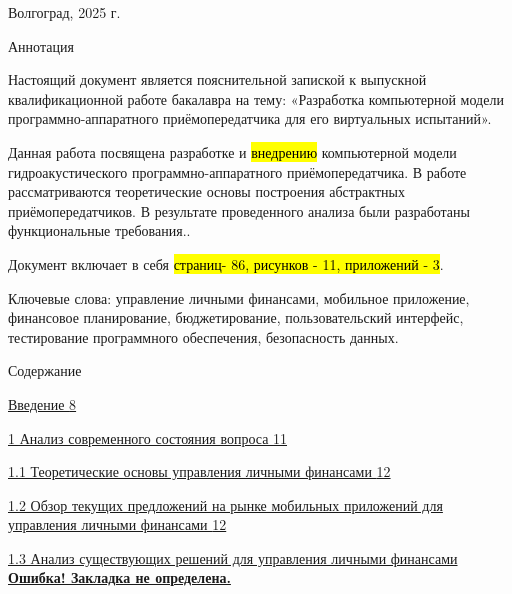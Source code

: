Волгоград, 2025 г.

Аннотация

Настоящий документ является пояснительной запиской к выпускной
квалификационной работе бакалавра на тему: «Разработка компьютерной
модели программно-аппаратного приёмопередатчика для его виртуальных
испытаний».

Данная работа посвящена разработке и \hl{внедрению} компьютерной модели
гидроакустического программно-аппаратного приёмопередатчика. В работе
рассматриваются теоретические основы построения абстрактных
приёмопередатчиков. В результате проведенного анализа были разработаны
функциональные требования..

Документ включает в себя \hl{страниц- 86, рисунков - 11, приложений -
3}.

Ключевые слова: управление личными финансами, мобильное приложение,
финансовое планирование, бюджетирование, пользовательский интерфейс,
тестирование программного обеспечения, безопасность данных.

Содержание

\hyperref[ux432ux432ux435ux434ux435ux43dux438ux435]{Введение
\hyperref[ux432ux432ux435ux434ux435ux43dux438ux435]{8}}

\hyperref[ux430ux43dux430ux43bux438ux437-ux441ux43eux432ux440ux435ux43cux435ux43dux43dux43eux433ux43e-ux441ux43eux441ux442ux43eux44fux43dux438ux44f-ux432ux43eux43fux440ux43eux441ux430]{1
Анализ современного состояния вопроса
\hyperref[ux430ux43dux430ux43bux438ux437-ux441ux43eux432ux440ux435ux43cux435ux43dux43dux43eux433ux43e-ux441ux43eux441ux442ux43eux44fux43dux438ux44f-ux432ux43eux43fux440ux43eux441ux430]{11}}

\hyperref[ux442ux435ux43eux440ux435ux442ux438ux447ux435ux441ux43aux438ux435-ux43eux441ux43dux43eux432ux44b-ux433ux438ux434ux440ux43eux430ux43aux443ux441ux442ux438ux447ux435ux441ux43aux438ux445-ux43fux440ux438ux451ux43cux43eux43fux435ux440ux435ux434ux430ux442ux447ux438ux43aux43eux432]{1.1
Теоретические основы управления личными финансами
\hyperref[ux442ux435ux43eux440ux435ux442ux438ux447ux435ux441ux43aux438ux435-ux43eux441ux43dux43eux432ux44b-ux433ux438ux434ux440ux43eux430ux43aux443ux441ux442ux438ux447ux435ux441ux43aux438ux445-ux43fux440ux438ux451ux43cux43eux43fux435ux440ux435ux434ux430ux442ux447ux438ux43aux43eux432]{12}}

\hyperref[_Toc167813676]{1.2 Обзор текущих предложений на рынке
мобильных приложений для управления личными финансами
\hyperref[_Toc167813676]{12}}

\hyperref[_Toc167813677]{1.3 Анализ существующих решений для управления
личными финансами \hyperref[_Toc167813677]{\textbf{Ошибка! Закладка не
определена.}}}

